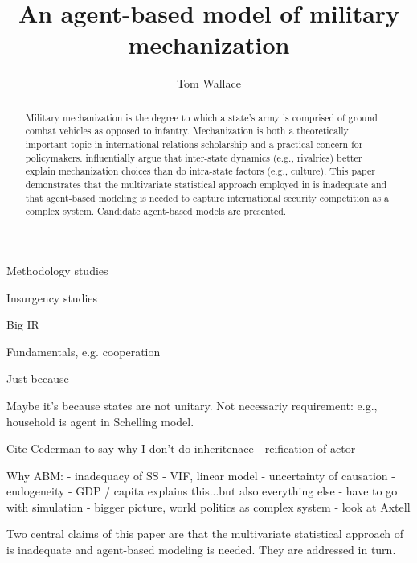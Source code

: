 \documentclass{article}
\title{An agent-based model of military mechanization}
\author{Tom Wallace}
\begin{document}
\maketitle

\begin{abstract}

Military mechanization is the degree to which a state's army is comprised of
ground combat vehicles as opposed to infantry. Mechanization is both a 
theoretically important topic in international relations scholarship and a practical 
concern for policymakers. \citet{sechser2010army} influentially argue that
inter-state dynamics (e.g., rivalries) better explain mechanization choices than do
intra-state factors (e.g., culture). This paper demonstrates that
the multivariate statistical approach employed in \citet{sechser2010army} is
	inadequate and that agent-based modeling is needed to capture
	international security competition as a complex system. Candidate
	agent-based models are presented.

\end{abstract}

\newpage

Methodology studies
\citep{pepinsky2005agents,de2014agent,
gunitsky2013complexity,bousquet2011beyond,
harrison2012complexity,jervis1998system,modelski1990world,modelski1999long,cederman2001agent}

Insurgency studies
\citep{cioffi2010mason,weidmann2013violence,bhavnani2012modeling,bhavnani2014group}

Big IR \citep{cederman2010growing,earnest2008coordination,masad2016dissertation}

Fundamentals, e.g. cooperation \citep{axelrod1981evolution}

Just because \citep{epstein1996growing}

Maybe it's because states are not unitary. Not necessariy requirement: e.g.,
household is agent in Schelling model. 

Cite Cederman to say why I don't do inheritenace - reification of actor

Why ABM:
 - inadequacy of SS - VIF, linear model
 - uncertainty of causation
 - endogeneity
 - GDP / capita explains this...but also everything else
 - have to go with simulation
 - bigger picture, world politics as complex system
 - look at Axtell \citep{axtell2000agents}

Two central claims of this paper are that the multivariate statistical approach
of \citet{sechser2010army} is inadequate and agent-based modeling is needed.
They are addressed in turn.
\end{document}

